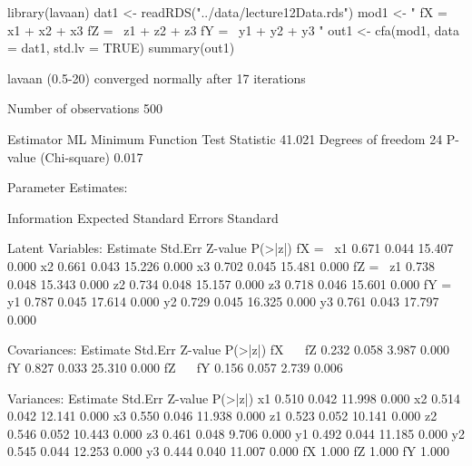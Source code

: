 \begin{Schunk}
\begin{Sinput}
 library(lavaan)
 dat1 <- readRDS("../data/lecture12Data.rds")
 mod1 <- "
 fX =~ x1 + x2 + x3
 fZ =~ z1 + z2 + z3
 fY =~ y1 + y2 + y3
 "
 out1 <- cfa(mod1, data = dat1, std.lv = TRUE)
 summary(out1)
\end{Sinput}
\begin{Soutput}
lavaan (0.5-20) converged normally after  17 iterations

  Number of observations                           500

  Estimator                                         ML
  Minimum Function Test Statistic               41.021
  Degrees of freedom                                24
  P-value (Chi-square)                           0.017

Parameter Estimates:

  Information                                 Expected
  Standard Errors                             Standard

Latent Variables:
                   Estimate  Std.Err  Z-value  P(>|z|)
  fX =~                                               
    x1                0.671    0.044   15.407    0.000
    x2                0.661    0.043   15.226    0.000
    x3                0.702    0.045   15.481    0.000
  fZ =~                                               
    z1                0.738    0.048   15.343    0.000
    z2                0.734    0.048   15.157    0.000
    z3                0.718    0.046   15.601    0.000
  fY =~                                               
    y1                0.787    0.045   17.614    0.000
    y2                0.729    0.045   16.325    0.000
    y3                0.761    0.043   17.797    0.000

Covariances:
                   Estimate  Std.Err  Z-value  P(>|z|)
  fX ~~                                               
    fZ                0.232    0.058    3.987    0.000
    fY                0.827    0.033   25.310    0.000
  fZ ~~                                               
    fY                0.156    0.057    2.739    0.006

Variances:
                   Estimate  Std.Err  Z-value  P(>|z|)
    x1                0.510    0.042   11.998    0.000
    x2                0.514    0.042   12.141    0.000
    x3                0.550    0.046   11.938    0.000
    z1                0.523    0.052   10.141    0.000
    z2                0.546    0.052   10.443    0.000
    z3                0.461    0.048    9.706    0.000
    y1                0.492    0.044   11.185    0.000
    y2                0.545    0.044   12.253    0.000
    y3                0.444    0.040   11.007    0.000
    fX                1.000                           
    fZ                1.000                           
    fY                1.000                           
\end{Soutput}
\end{Schunk}
